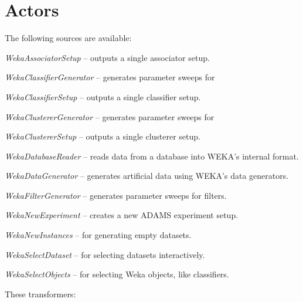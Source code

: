 \section{Actors}
The following sources are available:
\begin{tight_itemize}
	\item \textit{WekaAssociatorSetup} -- outputs a single associator setup.
	\item \textit{WekaClassifierGenerator} -- generates parameter sweeps for
	\item \textit{WekaClassifierSetup} -- outputs a single classifier setup.
	\item \textit{WekaClustererGenerator} -- generates parameter sweeps for
	\item \textit{WekaClustererSetup} -- outputs a single clusterer setup.
	\item \textit{WekaDatabaseReader} -- reads data from a database into
	WEKA's internal format.
	\item \textit{WekaDataGenerator} -- generates artificial data using WEKA's
	data generators.
	\item \textit{WekaFilterGenerator} -- generates parameter sweeps for
	filters.
	\item \textit{WekaNewExperiment} -- creates a new ADAMS experiment setup.
	\item \textit{WekaNewInstances} -- for generating empty datasets.
	\item \textit{WekaSelectDataset} -- for selecting datasets interactively.
	\item \textit{WekaSelectObjects} -- for selecting Weka objects, like
	classifiers.
\end{tight_itemize}
These transformers:
